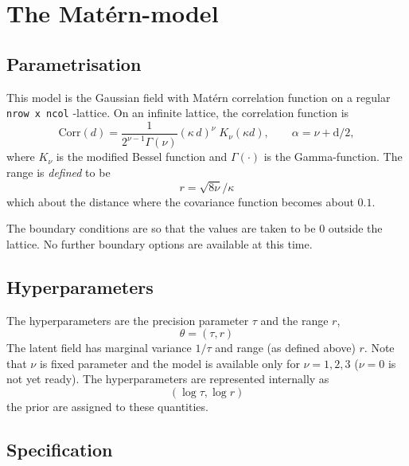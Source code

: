 \documentclass[a4paper,11pt]{article}
\begin{document}


\section*{The Mat\'ern-model}
\subsection*{Parametrisation}

This model is the Gaussian field with Mat\'ern correlation function on
a regular \verb|nrow x ncol| -lattice. On an infinite lattice, the
correlation function is 
\begin{displaymath}
    \text{Corr}(d)
    = \frac{1}{2^{\nu-1}\Gamma(\nu)}
    \left(\kappa\, {d}\right)^{\nu}
    \;
    K_{\nu}( \kappa d), \qquad \alpha = \nu + \text{d}/2,
\end{displaymath}
where $K_{\nu}$ is the modified Bessel function and $\Gamma(\cdot)$ is
the Gamma-function. The range is \emph{defined} to be
\begin{displaymath}
    r = {\sqrt{8\nu}}/{\kappa}
\end{displaymath}
which about the distance where the covariance function becomes
about $0.1$.

The boundary conditions are so that the values are taken to be $0$
outside the lattice. No further boundary options are available at this
time.

\subsection*{Hyperparameters}

The hyperparameters are the precision parameter $\tau$ and the range
$r$,
\begin{displaymath}
    \theta = (\tau, r)
\end{displaymath}
The latent field has marginal variance $1/\tau$ and range (as defined
above) $r$. Note that $\nu$ is fixed parameter and the model is
available only for $\nu=1,2,3$ ($\nu=0$ is not yet ready).  The
hyperparameters are represented internally as
\begin{displaymath}
    (\log\tau, \log r)
\end{displaymath}
the prior are assigned to these quantities.

\subsection*{Specification}
\end{document}
